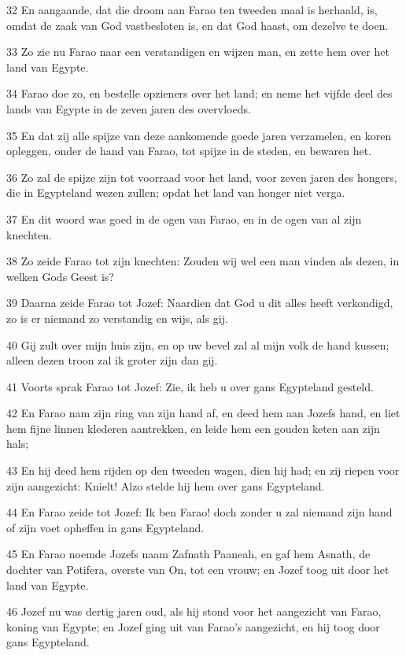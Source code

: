 \par 32 En aangaande, dat die droom aan Farao ten tweeden maal is herhaald, is, omdat de zaak van God vastbesloten is, en dat God haast, om dezelve te doen.
\par 33 Zo zie nu Farao naar een verstandigen en wijzen man, en zette hem over het land van Egypte.
\par 34 Farao doe zo, en bestelle opzieners over het land; en neme het vijfde deel des lands van Egypte in de zeven jaren des overvloeds.
\par 35 En dat zij alle spijze van deze aankomende goede jaren verzamelen, en koren opleggen, onder de hand van Farao, tot spijze in de steden, en bewaren het.
\par 36 Zo zal de spijze zijn tot voorraad voor het land, voor zeven jaren des hongers, die in Egypteland wezen zullen; opdat het land van honger niet verga.
\par 37 En dit woord was goed in de ogen van Farao, en in de ogen van al zijn knechten.
\par 38 Zo zeide Farao tot zijn knechten: Zouden wij wel een man vinden als dezen, in welken Gods Geest is?
\par 39 Daarna zeide Farao tot Jozef: Naardien dat God u dit alles heeft verkondigd, zo is er niemand zo verstandig en wijs, als gij.
\par 40 Gij zult over mijn huis zijn, en op uw bevel zal al mijn volk de hand kussen; alleen dezen troon zal ik groter zijn dan gij.
\par 41 Voorts sprak Farao tot Jozef: Zie, ik heb u over gans Egypteland gesteld.
\par 42 En Farao nam zijn ring van zijn hand af, en deed hem aan Jozefs hand, en liet hem fijne linnen klederen aantrekken, en leide hem een gouden keten aan zijn hals;
\par 43 En hij deed hem rijden op den tweeden wagen, dien hij had; en zij riepen voor zijn aangezicht: Knielt! Alzo stelde hij hem over gans Egypteland.
\par 44 En Farao zeide tot Jozef: Ik ben Farao! doch zonder u zal niemand zijn hand of zijn voet opheffen in gans Egypteland.
\par 45 En Farao noemde Jozefs naam Zafnath Paaneah, en gaf hem Asnath, de dochter van Potifera, overste van On, tot een vrouw; en Jozef toog uit door het land van Egypte.
\par 46 Jozef nu was dertig jaren oud, als hij stond voor het aangezicht van Farao, koning van Egypte; en Jozef ging uit van Farao's aangezicht, en hij toog door gans Egypteland.
